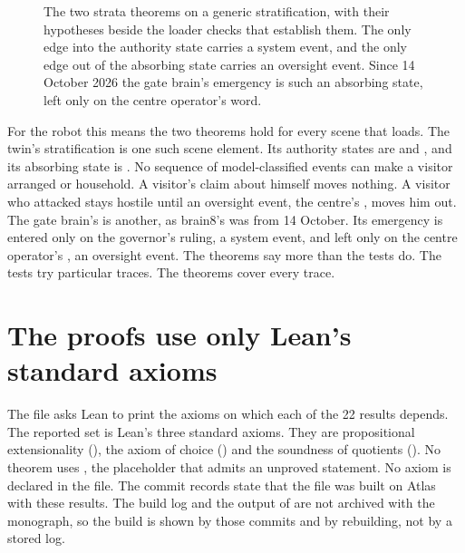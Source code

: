 \begin{figure}[t]
  \centering
  
  \caption{The two strata theorems on a generic stratification, with their hypotheses beside
  the loader checks that establish them. The only edge into the authority state carries a system
  event, and the only edge out of the absorbing state carries an oversight event. Since 14 October
  2026 the gate brain's emergency is such an absorbing state, left only on the centre operator's
  word.}
  \label{fig:lean-strata}
\end{figure}

For the robot this means the two theorems hold for every scene that loads.
The twin's  stratification is one such scene element.
Its authority states are  and , and its absorbing state is
.
No sequence of model-classified events can make a visitor arranged or household.
A visitor's claim about himself moves nothing.
A visitor who attacked stays hostile until an oversight event, the centre's ,
moves him out.
The gate brain's  is another, as brain8's was from 14 October.
Its emergency is entered only on the governor's ruling, a system event, and left only on the
centre operator's , an oversight event.
The theorems say more than the tests do.
The tests try particular traces.
The theorems cover every trace.

\section{The proofs use only Lean's standard axioms}\label{sec:lean-axioms}

The file  asks Lean to print the axioms on which each of the 22 results
depends.
The reported set is Lean's three standard axioms.
They are propositional extensionality (), the axiom of choice
() and the soundness of quotients ().
No theorem uses , the placeholder that admits an unproved statement.
No axiom is declared in the file.
The commit records state that the file was built on Atlas with these results.
The build log and the output of  are not archived with the monograph, so the
build is shown by those commits and by rebuilding, not by a stored log.

